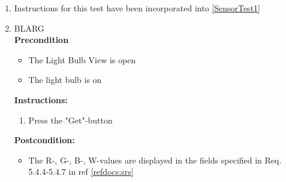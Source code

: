 \documentclass[a4paper]{article}
\newlength{\testlabellength}
\newenvironment{testlist}{\begin{enumerate}[label=\bfseries Instruction \thesubsection.\arabic* , labelindent=0pt, labelwidth=\testlabellength , leftmargin=2cm]}{\end{enumerate}}
\newenvironment{precondition}{
{\color{white}BLARG}\\ 
\textbf{Precondition}
\begin{itemize}[labelindent=0cm, labelwidth=2cm , leftmargin=1cm]
}
{\end{itemize}}
\newenvironment{instruction}{
\textbf{Instructions:}
\begin{enumerate}[label=\bfseries  \arabic*., labelindent=0cm, labelwidth=2cm , leftmargin=1cm]
}
{\end{enumerate}}
\newenvironment{postcondition}{
\textbf{Postcondition:}
\begin{itemize}[labelindent=0cm, labelwidth=2cm , leftmargin=1cm]
}
{\end{itemize}}
\begin{document}
\begin{appendices}
\begin{testlist}
	\item
		Instructions for this test have been incorporated into \ref{SensorTest1}


	\item
		\begin{precondition}
			\item The Light Bulb View is open
			\item The light bulb is on
		\end{precondition}
		\begin{instruction}
			\item Press the "Get"-button
		\end{instruction}
		\begin{postcondition}
			\item The R-, G-, B-, W-values are displayed in the fields specified in Req. 5.4.4-5.4.7 in ref \ref{refdocs:srs}
		\end{postcondition}


\end{testlist}
\end{appendices}
\end{document}
